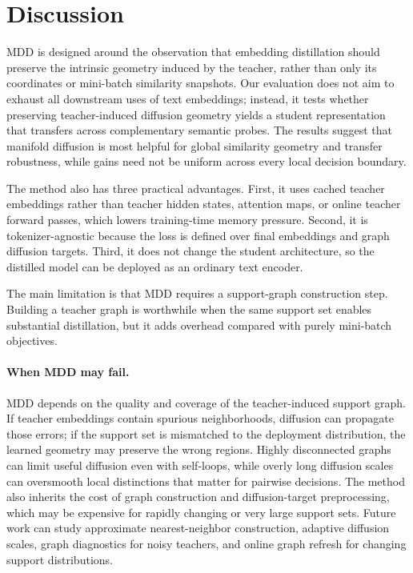 \section{Discussion}

MDD is designed around the observation that embedding distillation should preserve the intrinsic geometry induced by the teacher, rather than only its coordinates or mini-batch similarity snapshots. Our evaluation does not aim to exhaust all downstream uses of text embeddings; instead, it tests whether preserving teacher-induced diffusion geometry yields a student representation that transfers across complementary semantic probes. The results suggest that manifold diffusion is most helpful for global similarity geometry and transfer robustness, while gains need not be uniform across every local decision boundary.

The method also has three practical advantages. First, it uses cached teacher embeddings rather than teacher hidden states, attention maps, or online teacher forward passes, which lowers training-time memory pressure. Second, it is tokenizer-agnostic because the loss is defined over final embeddings and graph diffusion targets. Third, it does not change the student architecture, so the distilled model can be deployed as an ordinary text encoder.

The main limitation is that MDD requires a support-graph construction step. Building a teacher graph is worthwhile when the same support set enables substantial distillation, but it adds overhead compared with purely mini-batch objectives.

\paragraph{When MDD may fail.}
MDD depends on the quality and coverage of the teacher-induced support graph. If teacher embeddings contain spurious neighborhoods, diffusion can propagate those errors; if the support set is mismatched to the deployment distribution, the learned geometry may preserve the wrong regions. Highly disconnected graphs can limit useful diffusion even with self-loops, while overly long diffusion scales can oversmooth local distinctions that matter for pairwise decisions. The method also inherits the cost of graph construction and diffusion-target preprocessing, which may be expensive for rapidly changing or very large support sets. Future work can study approximate nearest-neighbor construction, adaptive diffusion scales, graph diagnostics for noisy teachers, and online graph refresh for changing support distributions.
